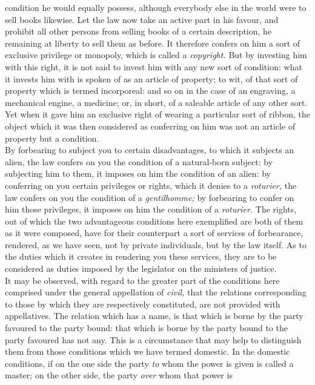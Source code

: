 \documentclass[12pt]{report}
\begin{document}
condition he would equally possess, although everybody else in the world
were to sell books likewise. Let the law now take an active part in his
favour, and prohibit all other persons from selling books of a certain
description, he remaining at liberty to sell them as before. It
therefore confers on him a sort of exclusive privilege or monopoly,
which is called a \emph{copyright.} But by investing him with this
right, it is not said to invest him with any new sort of condition: what
it invests him with is spoken of as an article of property; to wit, of
that sort of property which is termed incorporeal: and so on in the case
of an engraving, a mechanical engine, a medicine; or, in short, of a
saleable article of any other sort. Yet when it gave him an exclusive
right of wearing a particular sort of ribbon, the object which it was
then considered as conferring on him was not an article of property but
a condition.\\
By forbearing to subject you to certain disadvantages, to which it
subjects an alien, the law confers on you the condition of a
natural-born subject: by subjecting him to them, it imposes on him the
condition of an alien: by conferring on you certain privileges or
rights, which it denies to a \emph{roturier,} the law confers on you the
condition of a \emph{gentilhomme;} by forbearing to confer on him those
privileges, it imposes on him the condition of a \emph{roturier.} The
rights, out of which the two advantageous conditions here exemplified
are both of them as it were composed, have for their counterpart a sort
of services of forbearance, rendered, as we have seen, not by private
individuals, but by the law itself. As to the duties which it creates in
rendering you these services, they are to be considered as duties
imposed by the legislator on the ministers of justice.\\
It may be observed, with regard to the greater part of the conditions
here comprised under the general appellation of \emph{civil,} that the
relations corresponding to those by which they are respectively
constituted, are not provided with appellatives. The relation which has
a name, is that which is borne by the party favoured to the party bound:
that which is borne by the party bound to the party favoured has not
any. This is a circumstance that may help to distinguish them from those
conditions which we have termed domestic. In the domestic conditions, if
on the one side the party \emph{to} whom the power is given is called a
master; on the other side, the party \emph{over} whom that power is
\end{document}
